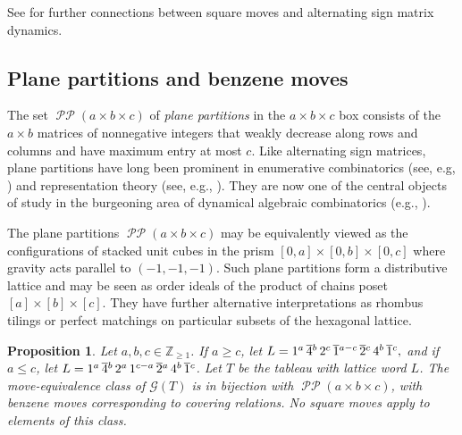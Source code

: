 \documentclass{amsart}
\newtheorem{proposition}[theorem]{Proposition}
\theoremstyle{definition}
\theoremstyle{remark}
\numberwithin{equation}{section}
\DeclareMathOperator{\PP}{\mathcal{PP}}
\begin{document}
See  for further connections between square moves and alternating sign matrix dynamics.

\subsection{Plane partitions and benzene moves}
\label{sec:plane-partitions}
The set $\PP(a \times b \times c)$ of \emph{plane partitions} in the $a \times b \times c$ box consists of the $a \times b$ matrices of nonnegative integers that weakly decrease along rows and columns and have maximum entry at most $c$. Like alternating sign matrices, plane partitions have long been prominent in enumerative combinatorics (see, e.g, \cite{Andrews:MacMahon,Andrews:Macdonald,Stembridge:Pfaffian}) and representation theory (see, e.g., \cite{Proctor:pp,Garver.Patrias.Thomas}). They are now one of the central objects of study in the burgeoning area of dynamical algebraic combinatorics (e.g., \cite{Striker.Williams,Striker:DAC,Hopkins:CSP,Patrias.Pechenik:CFDF}).

The plane partitions $\PP(a \times b \times c)$ may be equivalently viewed as the configurations of stacked unit cubes in the prism $[0, a] \times [0, b] \times [0, c]$ where gravity acts parallel to $(-1, -1, -1)$. Such plane partitions form a distributive lattice and may be seen as order ideals of the product of chains poset $[a]\times[b]\times[c]$. They have further alternative interpretations as rhombus tilings or perfect matchings on particular subsets of the hexagonal lattice.

\begin{proposition}
\label{prop:pp}
  Let $a, b, c \in \mathbb{Z}_{\geq 1}$. If $a \geq c$, let 
  $
  L = 1^a \, \overline{4}\vphantom{4}^b \, 2^c \, \overline{1}\vphantom{1}^{a-c} \, \overline{2}\vphantom{2}^c \, 4^b \, \overline{1}\vphantom{1}^c,
  $
  and if $a \leq c$, let $L = 1^a \, \overline{4}\vphantom{4}^b \, 2^a \, 1^{c-a} \, \overline{2}\vphantom{2}^a \, 4^b \, \overline{1}\vphantom{1}^c$. Let $T$ be the tableau with lattice word $L$. The move-equivalence class of $\mathcal{G}(T)$  is in bijection with $\PP(a \times b \times c)$, with benzene moves corresponding to covering relations. No square moves apply to elements of this class.
\end{proposition}
\end{document}
